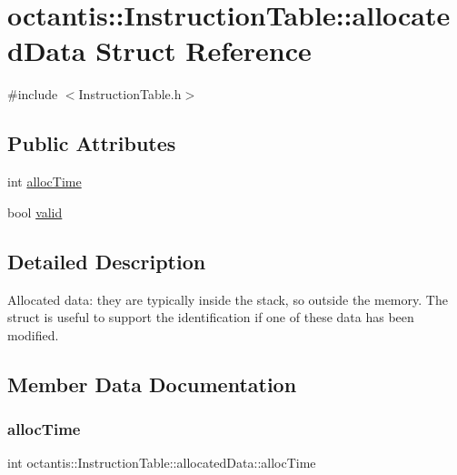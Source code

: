 \hypertarget{structoctantis_1_1InstructionTable_1_1allocatedData}{}\section{octantis\+:\+:Instruction\+Table\+:\+:allocated\+Data Struct Reference}
\label{structoctantis_1_1InstructionTable_1_1allocatedData}


{\ttfamily \#include $<$Instruction\+Table.\+h$>$}

\subsection*{Public Attributes}
\begin{DoxyCompactItemize}
\item 
int \hyperlink{structoctantis_1_1InstructionTable_1_1allocatedData_a93134066380dd21870cb0ae4e427e274}{alloc\+Time}
\item 
bool \hyperlink{structoctantis_1_1InstructionTable_1_1allocatedData_aa1655d3d2df0738a28ed8f722151f347}{valid}
\end{DoxyCompactItemize}


\subsection{Detailed Description}
Allocated data\+: they are typically inside the stack, so outside the memory. The struct is useful to support the identification if one of these data has been modified. 

\subsection{Member Data Documentation}
\mbox{\label{structoctantis_1_1InstructionTable_1_1allocatedData_a93134066380dd21870cb0ae4e427e274}} 
\subsubsection{\texorpdfstring{alloc\+Time}{allocTime}}
{\footnotesize\ttfamily int octantis\+::\+Instruction\+Table\+::allocated\+Data\+::alloc\+Time}

